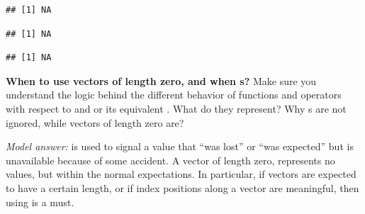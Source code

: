 \documentclass[krantz2]{krantz}\usepackage{knitr}
\begin{document}
\begin{knitrout}\footnotesize
{}\color{fgcolor}\begin{kframe}
\begin{alltt}
 \hlkwb{<-} 
\end{alltt}
\begin{verbatim}
## [1] NA
\end{verbatim}
\begin{alltt}
 \hlopt{+} 
\end{alltt}
\begin{verbatim}
## [1] NA
\end{verbatim}
\begin{alltt}
 \hlopt{+} 
\end{alltt}
\begin{verbatim}
## [1] NA
\end{verbatim}
\end{kframe}
\end{knitrout}

\begin{playground}
\textbf{When to use vectors of length zero, and when s?} Make sure you understand the logic behind the different behavior of functions and operators with respect to  and  or its equivalent . What do they represent? Why s are not ignored, while vectors of length zero are?

\begin{knitrout}\footnotesize
{}\color{fgcolor}\begin{kframe}
\begin{alltt}
 \hlopt{+} \hlstd{()}
 \hlopt{+} 
\end{alltt}
\end{kframe}
\end{knitrout}

\emph{Model answer:}
 is used to signal a value that ``was lost'' or ``was expected'' but is unavailable because of some accident. A vector of length zero, represents no values, but within the normal expectations. In particular, if vectors are expected to have a certain length, or if index positions along a vector are meaningful, then using  is a must.

\end{playground}
\end{document}
